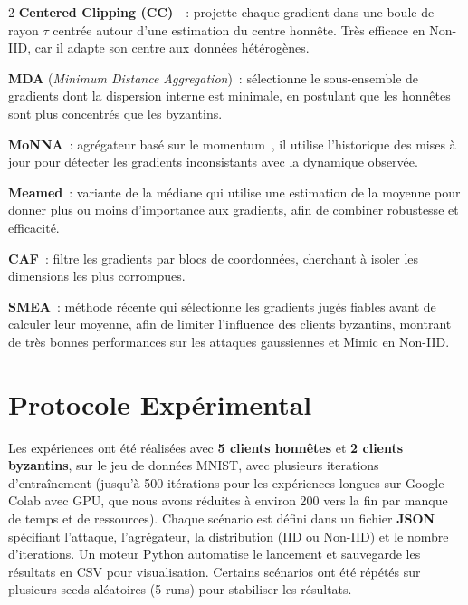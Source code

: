 \documentclass{article}
\begin{document}
\begin{multicols}{2}
\textbf{Centered Clipping (CC)}~\cite{karimireddy2021}~: projette chaque gradient dans
une boule de rayon $\tau$ centr\'ee autour d'une estimation du centre honnête. Tr\`es
efficace en Non-IID, car il adapte son centre aux donn\'ees h\'et\'erog\`enes.

\textbf{MDA} (\textit{Minimum Distance Aggregation})~: s\'electionne le sous-ensemble
de gradients dont la dispersion interne est minimale, en postulant que les honnêtes
sont plus concentr\'es que les byzantins.

\textbf{MoNNA}~: agr\'egateur bas\'e sur le momentum~, il utilise l'historique des mises
\`a jour pour d\'etecter les gradients inconsistants avec la dynamique observ\'ee.

\textbf{Meamed}~: variante de la m\'ediane qui utilise une estimation de la moyenne pour donner plus ou moins d'importance aux gradients, afin de combiner robustesse et efficacit\'e.

\textbf{CAF}~: filtre les gradients par blocs de coordonn\'ees, cherchant \`a isoler
les dimensions les plus corrompues.

\textbf{SMEA}~: m\'ethode r\'ecente qui s\'electionne les gradients jug\'es fiables avant de calculer leur moyenne, afin de limiter l'influence des clients byzantins, montrant
de tr\`es bonnes performances sur les attaques gaussiennes et Mimic en Non-IID.

\section{Protocole Exp\'erimental}

Les exp\'eriences ont \'et\'e r\'ealis\'ees avec \textbf{5 clients honnêtes} et
\textbf{2 clients byzantins}, sur le jeu de donn\'ees MNIST, avec plusieurs iterations
d'entra\^inement (jusqu’à 500 itérations pour les expériences longues sur Google Colab avec GPU, que nous avons réduites à environ 200 vers la fin par manque de temps et de ressources). Chaque sc\'enario est d\'efini dans un fichier \textbf{JSON} sp\'ecifiant
l'attaque, l'agr\'egateur, la distribution (IID ou Non-IID) et le nombre d'iterations.
Un moteur Python automatise le lancement et sauvegarde les r\'esultats en CSV pour
visualisation. Certains sc\'enarios ont \'et\'e r\'ep\'et\'es sur plusieurs seeds al\'eatoires (5 runs)
pour stabiliser les r\'esultats.


\end{multicols}
\end{document}
